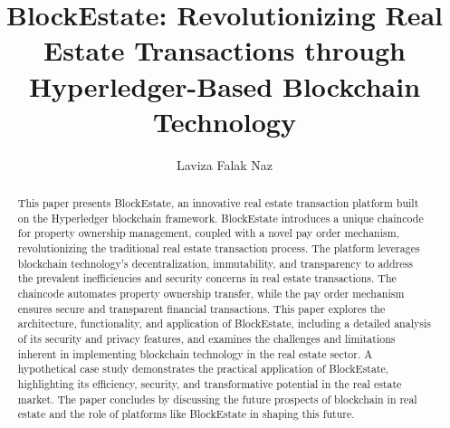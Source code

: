 \documentclass[3p,times]{elsarticle}
\begin{document}
\begin{frontmatter}



\dochead{}

\title{BlockEstate: Revolutionizing Real Estate Transactions through Hyperledger-Based Blockchain Technology}

\author[label1]{Laviza Falak Naz}%
\address[label1]{NED University of Engineering \& Technology}

\begin{abstract}
This paper presents BlockEstate, an innovative real estate transaction platform built on the Hyperledger blockchain framework. BlockEstate introduces a unique chaincode for property ownership management, coupled with a novel pay order mechanism, revolutionizing the traditional real estate transaction process. The platform leverages blockchain technology's decentralization, immutability, and transparency to address the prevalent inefficiencies and security concerns in real estate transactions. The chaincode automates property ownership transfer, while the pay order mechanism ensures secure and transparent financial transactions. This paper explores the architecture, functionality, and application of BlockEstate, including a detailed analysis of its security and privacy features, and examines the challenges and limitations inherent in implementing blockchain technology in the real estate sector. A hypothetical case study demonstrates the practical application of BlockEstate, highlighting its efficiency, security, and transformative potential in the real estate market. The paper concludes by discussing the future prospects of blockchain in real estate and the role of platforms like BlockEstate in shaping this future.
\end{abstract}


\end{frontmatter}
\end{document}
